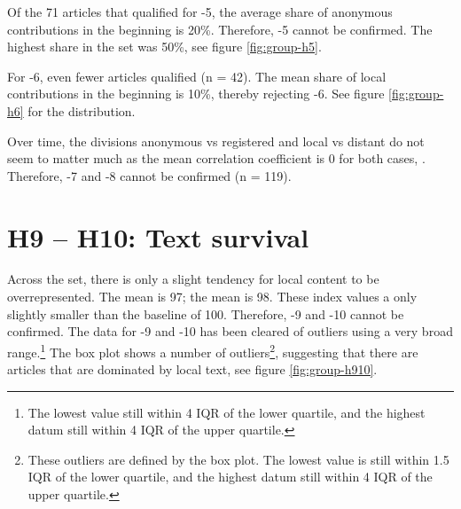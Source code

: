 Of the 71 articles that qualified for \hyp{5}, the average share of anonymous contributions in the beginning is 20\%.
Therefore, \hyp{5} cannot be confirmed.
The highest share in the set was 50\%, see figure \ref{fig:group-h5}.

For \hyp{6}, even fewer articles qualified (n = 42).
The mean share of local contributions in the beginning is 10\%, thereby rejecting \hyp{6}.
See figure \ref{fig:group-h6} for the distribution.


Over time, the divisions anonymous vs registered and local vs distant do not seem to matter much as the mean correlation coefficient is 0 for both cases, .
Therefore, \hyp{7} and \hyp{8} cannot be confirmed (n = 119).



\section{H9 -- H10: Text survival}\label{sec:h9h10}

Across the set, there is only a slight tendency for local content to be overrepresented. 
The mean  is 97; the mean  is 98.
These index values a only slightly smaller than the baseline of 100.
Therefore, \hyp{9} and \hyp{10} cannot be confirmed.
The data for \hyp{9} and \hyp{10} has been cleared of outliers using a very broad range.\footnote{The lowest value still within 4 \ac{IQR} of the lower quartile, and the highest datum still within 4 \ac{IQR} of the upper quartile.}
The box plot shows a number of outliers\footnote{These outliers are defined by the box plot. The lowest value is still within 1.5 \ac{IQR} of the lower quartile, and the highest datum still within 4 \ac{IQR} of the upper quartile.}, suggesting that there are articles that are dominated by local text, see figure \ref{fig:group-h910}.



